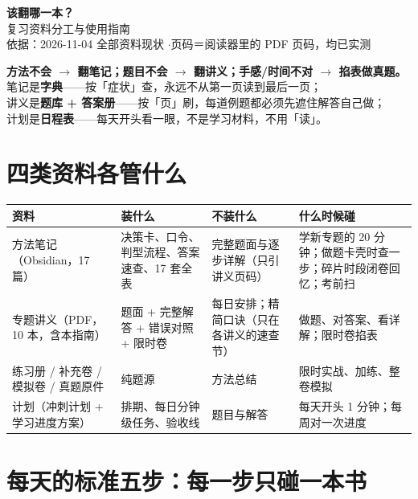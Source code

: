 \documentclass[11pt,a4paper]{ctexart}
\begin{document}
\begin{center}
{\LARGE\bfseries 该翻哪一本？}\\[3pt]
{\large 复习资料分工与使用指南}\\[6pt]
{\small 依据：2026-11-04 全部资料现状 \quad$\cdot$\quad 页码＝阅读器里的 PDF 页码，均已实测}
\end{center}

\vspace{-2pt}
\begin{keypoint}
\textbf{方法不会 $\to$ 翻笔记；题目不会 $\to$ 翻讲义；手感/时间不对 $\to$ 掐表做真题。}\\[2pt]
笔记是\textbf{字典}——按「症状」查，永远不从第一页读到最后一页；\\
讲义是\textbf{题库 + 答案册}——按「页」刷，每道例题都必须先遮住解答自己做；\\
计划是\textbf{日程表}——每天开头看一眼，不是学习材料，不用「读」。
\end{keypoint}

\section{四类资料各管什么}

{\footnotesize
\renewcommand{\arraystretch}{1.22}
\begin{tabularx}{\textwidth}{@{}>{\raggedright\arraybackslash}p{2.5cm} >{\raggedright\arraybackslash}p{4.3cm} >{\raggedright\arraybackslash}p{4.5cm} >{\raggedright\arraybackslash}X@{}}
\toprule
\textbf{资料} & \textbf{装什么} & \textbf{不装什么} & \textbf{什么时候碰} \\
\midrule
方法笔记（Obsidian，17 篇） & 决策卡、口令、判型流程、答案速查、17 套全表 & 完整题面与逐步详解（只引讲义页码） & 学新专题的 20 分钟；做题卡壳时查一步；碎片时段闭卷回忆；考前扫 \\
专题讲义（PDF，10 本，含本指南） & 题面 + 完整解答 + 错误对照 + 限时卷 & 每日安排；精简口诀（只在各讲义的速查节） & 做题、对答案、看详解；限时卷掐表 \\
练习册 / 补充卷 / 模拟卷 / 真题原件 & 纯题源 & 方法总结 & 限时实战、加练、整卷模拟 \\
计划（冲刺计划 + 学习进度方案） & 排期、每日分钟级任务、验收线 & 题目与解答 & 每天开头 1 分钟；每周对一次进度 \\
\bottomrule
\end{tabularx}}

\section{每天的标准五步：每一步只碰一本书}
\end{document}
